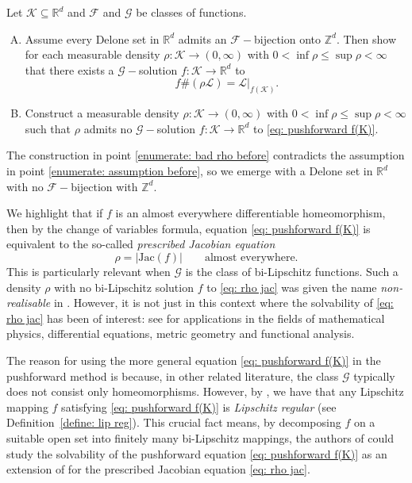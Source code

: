 \documentclass{article}
\newcommand{\R}{\mathbb{R}}
\newcommand{\Z}{\mathbb{Z}}
\newcommand{\leb}{\mc{L}}
\newcommand{\mc}[1]{\mathcal{#1}}
\begin{document}
Let $\mathcal{K} \subseteq \R^d$ and $\mathcal{F}$ and $\mathcal{G}$ be classes of functions.
\begin{enumerate}[(A)] 
    \item \label{enumerate: assumption before}\label{enumerate: construction before}  Assume every Delone set in $\R^d$ admits an $\mathcal{F}-$bijection onto $\Z^d$.
Then show for each measurable density $\rho:\mathcal{K}\to (0,\infty)$ with $0 < \inf \rho \leq \sup \rho < \infty$ that there exists a $\mathcal{G}-$solution $f:\mathcal{K} \to \R^d$ to 
    \begin{equation} \label{eq: pushforward f(K)}
        \qquad f\#(\rho \leb) = \leb|_{f(\mathcal{K})}.
    \end{equation} 
    \item \label{enumerate: bad rho before} Construct a measurable density $\rho:\mathcal{K} \to (0,\infty)$ with $0 < \inf \rho \leq \sup \rho < \infty$ such that $\rho$ admits no $\mathcal{G}-$solution $f:\mathcal{K} \to \R^d$ to \eqref{eq: pushforward f(K)}.
\end{enumerate}
 The construction in point \ref{enumerate: bad rho before} contradicts the assumption in point \ref{enumerate: assumption before}, so we emerge with a Delone set in $\R^d$ with no $\mathcal{F}-$bijection with $\Z^d.$
 
We highlight that if $f$ is an almost everywhere differentiable homeomorphism, then by the change of variables formula, equation \eqref{eq: pushforward f(K)} is equivalent to the so-called \emph{prescribed Jacobian equation}
\begin{equation} \label{eq: rho jac}
    \rho = |\text{Jac}(f)| \qquad \text{almost everywhere.}
\end{equation} This is particularly relevant when $\mathcal{G}$ is the class of bi-Lipschitz functions. Such a density $\rho$ with no bi-Lipschitz solution $f$ to \eqref{eq: rho jac} was given the name \emph{non-realisable} in \cite{mcmullen1998lipschitz}. However, it is not just in this context where the solvability of \eqref{eq: rho jac} has been of interest: see \cite{dacorogna2007direct,riviere1996resolutions,dymond2018mapping,dymond2023highly} for applications in the fields of mathematical physics, differential equations, metric geometry and functional analysis. 

The reason for using the more general equation \eqref{eq: pushforward f(K)} in the pushforward method is because, in other related literature, the class $\mathcal{G}$ typically does not consist only homeomorphisms. However, by \cite[Lemma~$12.6$]{david1997fractured}, we have that any Lipschitz mapping $f$ satisfying \eqref{eq: pushforward f(K)} is \emph{Lipschitz regular} (see Definition~\ref{define: lip reg}). This crucial fact means, by decomposing $f$ on a suitable open set into finitely many bi-Lipschitz mappings, the authors of \cite{dymond2018mapping} could study the solvability of the pushforward equation \eqref{eq: pushforward f(K)} as an extension of  \cite{burago1998separated,mcmullen1998lipschitz} for the prescribed Jacobian equation \eqref{eq: rho jac}.
\end{document}
